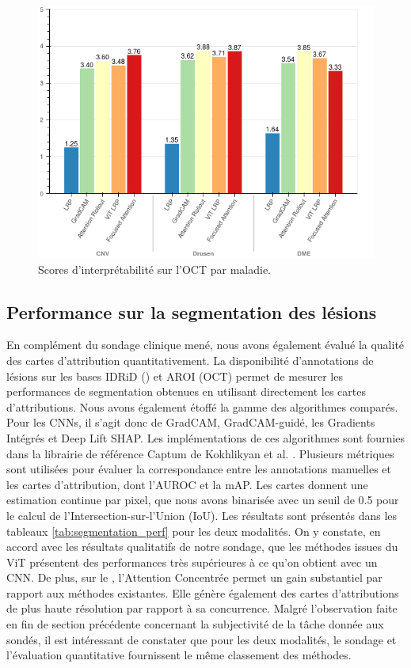 \begin{figure}[!h]
	\centering
	\includegraphics[width=0.7\linewidth]{gnuplot/focused_attention/survey/oct_per_disease}
	\caption{Scores d'interprétabilité sur l'OCT par maladie.}
	\label{fig:octperdisease}
\end{figure}
\subsection{Performance sur la segmentation des lésions}
En complément du sondage clinique mené, nous avons également évalué la qualité des cartes d'attribution quantitativement. La disponibilité d'annotations de lésions sur les bases IDRiD (\fundus{}) et AROI (OCT) permet de mesurer les performances de segmentation obtenues en utilisant directement les cartes d'attributions. Nous avons également étoffé la gamme des algorithmes comparés. Pour les CNNs, il s'agit donc de GradCAM, GradCAM-guidé, les Gradients Intégrés et Deep Lift SHAP. Les implémentations de ces algorithmes sont fournies dans la librairie de référence Captum de Kokhlikyan et al. \cite{kokhlikyan2020captum}. Plusieurs métriques sont utilisées pour évaluer la correspondance entre les annotations manuelles et les cartes d'attribution, dont l'\ac{AUROC} et la \ac{mAP}. Les cartes donnent une estimation continue par pixel, que nous avons binarisée avec un seuil de 0.5 pour le calcul de l'Intersection-sur-l'Union (IoU). Les résultats sont présentés dans les tableaux \ref{tab:segmentation_perf} pour les deux modalités. On y constate, en accord avec les résultats qualitatifs de notre sondage, que les méthodes issues du ViT présentent des performances très supérieures à ce qu'on obtient avec un CNN. De plus, sur le \fundus, l'Attention Concentrée permet un gain substantiel par rapport aux méthodes existantes. Elle génère également des cartes d'attributions de plus haute résolution par rapport à sa concurrence. Malgré l'observation faite en fin de section précédente concernant la subjectivité de la tâche donnée aux sondés, il est intéressant de constater que pour les deux modalités, le sondage et l'évaluation quantitative fournissent le même classement des méthodes.

